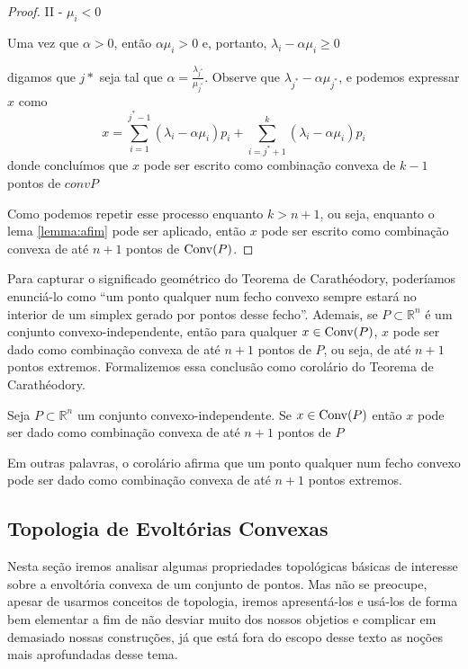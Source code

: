 \begin{thm:caratheodory}[Carathéodory]
\begin{proof}
		II - $\mu_i < 0$

		Uma vez que $\alpha > 0$, então $\alpha \mu_i > 0$ e, portanto,
		\(\lambda_i - \alpha \mu_i \geq 0\)

		digamos que $j*$ seja tal que $\alpha = \frac{\lambda_{j^*}}{\mu_{j^*}}$. Observe que
		$\lambda_{j^*} - \alpha \mu_{j^*}$, e podemos expressar $x$ como
		\[x = \displaystyle\sum_{i=1}^{j^* - 1} (\lambda_i - \alpha \mu_i)p_i +
				\displaystyle\sum_{i=j^* + 1}^{k} (\lambda_i - \alpha \mu_i)p_i\]
		donde concluímos que $x$ pode ser escrito como combinação convexa de $k - 1$ pontos de $conv{P}$

		Como podemos repetir esse processo enquanto $k > n + 1$, ou seja, enquanto o lema \ref{lemma:afim}
		pode ser aplicado, então $x$ pode ser escrito como combinação convexa de até $n + 1$ pontos de $\mathrm{Conv}(P)$.
	\end{proof}
\end{thm:caratheodory}

Para capturar o significado geométrico do Teorema de Carathéodory, poderíamos
enunciá-lo como ``um ponto qualquer num fecho convexo sempre estará no interior
de um simplex gerado por pontos desse fecho''. Ademais, se $P \subset \mathbb{R}^n$ é um conjunto
convexo-independente, então para qualquer $x \in \mathrm{Conv}(P)$, $x$ pode ser dado
como combinação convexa de até $n+1$ pontos de $P$, ou seja, de até $n+1$ pontos extremos.
Formalizemos essa conclusão como corolário do Teorema de Carathéodory.

\begin{cor:caratheodory}
	Seja $P \subset \mathbb{R}^n$ um conjunto convexo-independente. Se $x \in \mathrm{Conv}(P)$
	então $x$ pode ser dado como combinação convexa de até $n + 1$ pontos de $P$
\end{cor:caratheodory}

Em outras palavras, o corolário afirma que um ponto qualquer num fecho convexo
pode ser dado como combinação convexa de até $n+1$ pontos extremos.

\subsection{Topologia de Evoltórias Convexas}

Nesta seção iremos analisar algumas propriedades topológicas básicas de
interesse sobre a envoltória convexa de um conjunto de pontos. Mas não se
preocupe, apesar de usarmos conceitos de topologia, iremos apresentá-los
e usá-los de forma bem elementar a fim de não desviar muito dos nossos
objetios e complicar em demasiado nossas construções, já que está fora do
escopo desse texto as noções mais aprofundadas desse tema.

